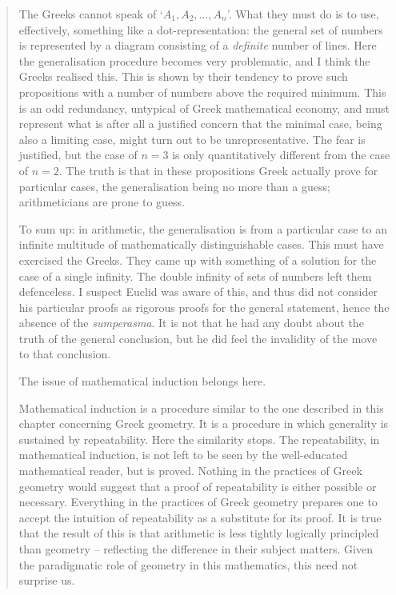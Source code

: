 \documentclass{article}
\begin{document}
\begin{quote}
The Greeks cannot speak of `$A_1,A_2,\ldots,A_n$'.
What they must do is to use, effectively, something like a dot-representation:
the general set of numbers is represented by a diagram consisting 
of a {\em definite} number of lines. Here the generalisation procedure
becomes very problematic, and I think the Greeks realised this. This is
shown by their tendency to prove such propositions with a number of
numbers above the required minimum. This is an odd redundancy,
untypical of Greek mathematical economy, and must represent what is
after all a justified concern that the minimal case, being also a limiting
case, might turn out to be unrepresentative. The fear is justified, but
the case of $n=3$ is only quantitatively different from the case of $n=2$.
The truth is that in these propositions Greek actually prove for particular
cases, the generalisation being no more than a guess; arithmeticians
are prone to guess.

To sum up: in arithmetic, the generalisation is from a particular
case to an infinite multitude of mathematically distinguishable cases.
This must have exercised the Greeks. They came up with something
of a solution for the case of a single infinity. The double infinity of sets
of numbers left them defenceless. I suspect Euclid was aware of this,
and thus did not consider his particular proofs as rigorous proofs for
the general statement, hence the absence of the {\em sumperasma}. It is not
that he had any doubt about the truth of the general conclusion, but
he did feel the invalidity of the move to that conclusion.

The issue of mathematical induction belongs here.

Mathematical induction is a procedure similar to the one described
in this chapter concerning Greek geometry. It is a procedure in which
generality is sustained by repeatability. Here the similarity stops. The
repeatability, in mathematical induction, is not left to be seen by the
well-educated mathematical reader, but is proved. Nothing in the
practices of Greek geometry would suggest that a proof of repeatability
is either possible or necessary. Everything in the practices of Greek
geometry prepares one to accept the intuition of repeatability as a substitute
for its proof. It is true that the result of this is that arithmetic is
less tightly logically principled than geometry -- reflecting the difference
in their subject matters. Given the paradigmatic role of geometry in
this mathematics, this need not surprise us.
\end{quote}
\end{document}
